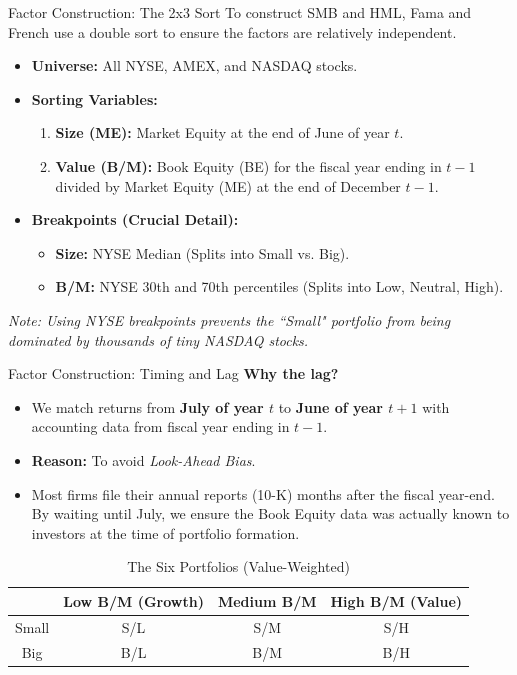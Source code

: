 \documentclass{beamer}
\begin{document}
\begin{frame}{Factor Construction: The 2x3 Sort}
	To construct SMB and HML, Fama and French use a double sort to ensure the factors are relatively independent.
	
	\begin{itemize}
		\item \textbf{Universe:} All NYSE, AMEX, and NASDAQ stocks.
		\item \textbf{Sorting Variables:}
		\begin{enumerate}
			\item \textbf{Size (ME):} Market Equity at the end of June of year $t$.
			\item \textbf{Value (B/M):} Book Equity (BE) for the fiscal year ending in $t-1$ divided by Market Equity (ME) at the end of December $t-1$.
		\end{enumerate}
		\item \textbf{Breakpoints (Crucial Detail):}
		\begin{itemize}
			\item \textbf{Size:} NYSE Median (Splits into Small vs. Big).
			\item \textbf{B/M:} NYSE 30th and 70th percentiles (Splits into Low, Neutral, High).
		\end{itemize}
	\end{itemize}
	\textit{Note: Using NYSE breakpoints prevents the ``Small" portfolio from being dominated by thousands of tiny NASDAQ stocks.}
\end{frame}

\begin{frame}{Factor Construction: Timing and Lag}
	\textbf{Why the lag?}
	\begin{itemize}
		\item We match returns from \textbf{July of year $t$} to \textbf{June of year $t+1$} with accounting data from fiscal year ending in \textbf{$t-1$}.
		\item \textbf{Reason:} To avoid \textit{Look-Ahead Bias}.
		\item Most firms file their annual reports (10-K) months after the fiscal year-end. By waiting until July, we ensure the Book Equity data was actually known to investors at the time of portfolio formation.
	\end{itemize}
	
	\begin{table}[h]
		\centering
		\caption{The Six Portfolios (Value-Weighted)}
		\begin{tabular}{c|ccc}
			\hline
			& Low B/M (Growth) & Medium B/M & High B/M (Value) \\
			\hline
			Small & S/L & S/M & S/H \\
			Big   & B/L & B/M & B/H \\
			\hline
		\end{tabular}
	\end{table}
\end{frame}
\end{document}
